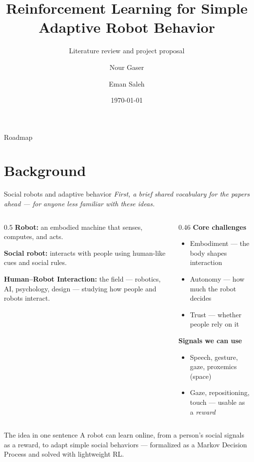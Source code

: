 \documentclass[aspectratio=169,10pt]{beamer}
\title{Reinforcement Learning for Simple Adaptive Robot Behavior}
\subtitle{Literature review and project proposal}
\author{Nour Gaser \and Eman Saleh}
\institute{German International University}
\date{\today}
\begin{document}
\maketitle

\begin{frame}{Roadmap}
  \tableofcontents
\end{frame}

\section{Background}

\begin{frame}{Social robots and adaptive behavior}
  {\footnotesize\itshape First, a brief shared vocabulary for the papers ahead --- for anyone less familiar with these ideas.}
  \vspace{0.4em}
  \begin{columns}[T]
    \begin{column}{0.5\textwidth}
      \textbf{Robot:} an embodied machine that senses, computes, and acts.

      \medskip
      \textbf{Social robot:} interacts with people using human-like cues and social rules.

      \medskip
      \textbf{Human--Robot Interaction:} the field --- robotics, AI, psychology, design --- studying how people and robots interact.
    \end{column}
    \begin{column}{0.46\textwidth}
      \textbf{Core challenges}
      \begin{itemize}\footnotesize
        \item Embodiment --- the body shapes interaction
        \item Autonomy --- how much the robot decides
        \item Trust --- whether people rely on it
      \end{itemize}
      \medskip
      \textbf{Signals we can use}
      \begin{itemize}\footnotesize
        \item Speech, gesture, gaze, proxemics (space)
        \item Gaze, repositioning, touch --- usable as a \emph{reward}
      \end{itemize}
    \end{column}
  \end{columns}
  \vspace{0.4em}
  \begin{block}{The idea in one sentence}
    A robot can learn online, from a person's social signals as a reward, to adapt simple social behaviors --- formalized as a Markov Decision Process and solved with lightweight RL.
  \end{block}
\end{frame}
\end{document}
